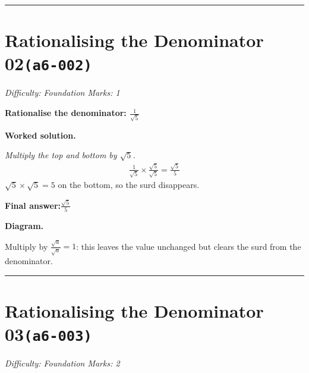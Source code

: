 \documentclass[11pt]{article}
\newcommand{\question}[1]{\par\medskip\noindent\textbf{#1}\par}
\begin{document}
\medskip\hrule

\section*{Rationalising the Denominator 02\quad\small\texttt{(a6-002)}}
\textit{Difficulty: Foundation \quad\textbar\quad Marks: 1}

\question{Rationalise the denominator: \( \frac{1}{\sqrt{5}} \)}

\textbf{Worked solution.}

\textit{Multiply the top and bottom by \( \sqrt{5} \).}
\[\begin{gathered}
\frac{1}{\sqrt{5}} \times \frac{\sqrt{5}}{\sqrt{5}} = \frac{\sqrt{5}}{5}
\end{gathered}\]
\( \sqrt{5} \times \sqrt{5} = 5 \) on the bottom, so the surd disappears.

\begin{answerbox}
\textbf{Final answer:}\quad \(\displaystyle \frac{\sqrt{5}}{5}\)
\end{answerbox}
\textbf{Diagram.}

\begin{center}
\end{center}
\small Multiply by $\frac{\sqrt{a}}{\sqrt{a}}=1$: this leaves the value unchanged but clears the surd from the denominator.\normalsize

\medskip\hrule

\section*{Rationalising the Denominator 03\quad\small\texttt{(a6-003)}}
\textit{Difficulty: Foundation \quad\textbar\quad Marks: 2}
\end{document}
